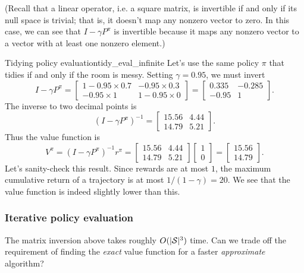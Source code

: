 \documentclass[../main/main]{subfiles}
\begin{document}
(Recall that a linear operator, i.e. a square matrix, is invertible if and only if its null space is trivial; that is, it doesn't map any nonzero vector to zero. In this case, we can see that $I - \gamma P^\pi$ is invertible because it maps any nonzero vector to a vector with at least one nonzero element.)

\begin{example}{Tidying policy evaluation}{tidy_eval_infinite}
    Let's use the same policy $\pi$ that tidies if and only if the room is messy.
    Setting $\gamma = 0.95$, we must invert
    \[
        I - \gamma P^{\pi} = \begin{bmatrix} 1 - 0.95 \times 0.7 & - 0.95 \times 0.3 \\ - 0.95 \times 1 & 1 - 0.95 \times 0 \end{bmatrix} = \begin{bmatrix} 0.335 & -0.285 \\ -0.95 & 1 \end{bmatrix}.
    \]
    The inverse to two decimal points is
    \[
        (I - \gamma P^{\pi})^{-1} = \begin{bmatrix} 15.56 & 4.44 \\ 14.79 & 5.21 \end{bmatrix}.
    \]
    Thus the value function is
    \[
        V^{\pi} = (I - \gamma P^{\pi})^{-1} r^{\pi} = \begin{bmatrix} 15.56 & 4.44 \\ 14.79 & 5.21 \end{bmatrix} \begin{bmatrix} 1 \\ 0 \end{bmatrix} = \begin{bmatrix} 15.56 \\ 14.79 \end{bmatrix}.
    \]
    Let's sanity-check this result. Since rewards are at most $1$, the maximum cumulative return of a trajectory is at most $1/(1-\gamma) = 20$. We see that the value function is indeed slightly lower than this.
\end{example}


\subsubsection{Iterative policy evaluation}
\label{sec:iterative_pe}

The matrix inversion above takes roughly $O(|\S|^3)$ time. Can we trade off the requirement of finding the \emph{exact} value function for a faster \emph{approximate} algorithm?
\end{document}
